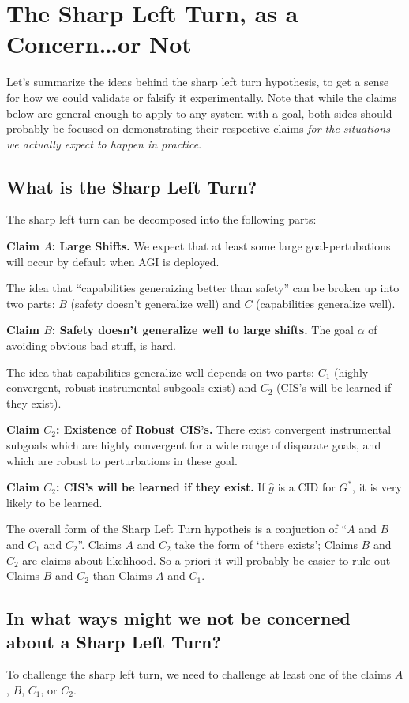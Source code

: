 \documentclass{article}
\begin{document}
\section{The Sharp Left Turn, as a Concern\ldots or Not}
Let's summarize the ideas behind the sharp left turn hypothesis, to get a sense for how we could validate or falsify it experimentally. Note that while the claims below are general enough to apply to any system with a goal, both sides should probably be focused on demonstrating their respective claims \emph{for the situations we actually expect to happen in practice}. 

\subsection{What is the Sharp Left Turn?} 
The sharp left turn can be decomposed into the following parts:

\textbf{Claim $A$: Large Shifts.} We expect that at least some large goal-pertubations will occur by default when AGI is deployed.

The idea that ``capabilities generaizing better than safety'' can be broken up into two parts: \textbf{$B$} (safety doesn't generalize well) and \textbf{$C$} (capabilities generalize well).

\textbf{Claim $B$: Safety doesn't generalize well to large shifts.} The goal $\alpha$ of avoiding obvious bad stuff, is hard. 

The idea that capabilities generalize well depends on two parts: \textbf{$C_1$} (highly convergent, robust instrumental subgoals exist) and \textbf{$C_2$} (CIS's will be learned if they exist).

\textbf{Claim $C_2$: Existence of Robust CIS's.} There exist convergent instrumental subgoals which are highly convergent for a wide range of disparate goals, and which are robust to perturbations in these goal.

\textbf{Claim $C_2$: CIS's will be learned if they exist.} If $\hat{g}$ is a CID for $G^*$, it is very likely to be learned.

The overall form of the Sharp Left Turn hypotheis is a conjuction of ``$A$ and $B$ and $C_1$ and $C_2$''. Claims $A$ and $C_2$ take the form of `there exists'; Claims $B$ and $C_2$ are claims about likelihood. So a priori it will probably be easier to rule out Claims $B$ and $C_2$ than Claims $A$ and $C_1$.

\subsection{In what ways might we not be concerned about a Sharp Left Turn?}
To challenge the sharp left turn, we need to challenge at least one of the claims $A$, $B$, $C_1$, or $C_2$. 
\end{document}
